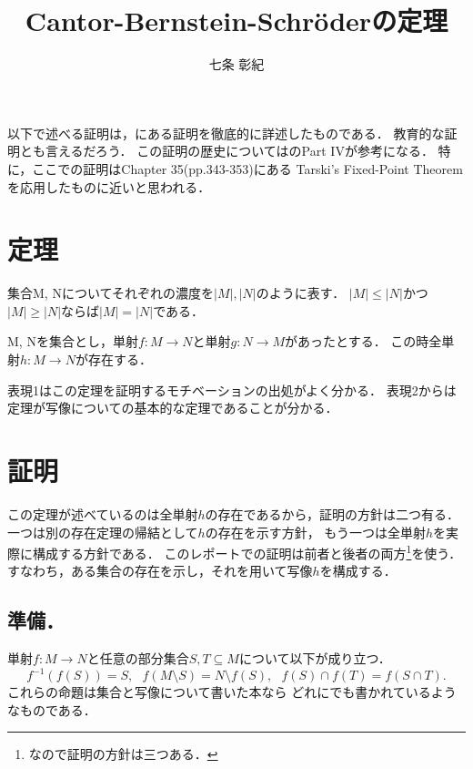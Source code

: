 \documentclass[lualatex, ja=standard, a4paper]{bxjsarticle}
\begin{document}
    \title{Cantor-Bernstein-Schr\"{o}derの定理}
    \author{七条 彰紀}
    \maketitle
    
    以下で述べる証明は，\cite{thebook}にある証明を徹底的に詳述したものである．
    教育的な証明とも言えるだろう．
    この証明の歴史については\cite{cbt}のPart IVが参考になる．
    特に，ここでの証明はChapter 35(pp.343-353)にある
    Tarski's Fixed-Point Theoremを応用したものに近いと思われる．

    \section{定理}
    \begin{Thm}[表現1]
        集合M, Nについてそれぞれの濃度を$|M|, |N|$のように表す．
        $|M| \leq |N|$かつ$|M| \geq |N|$ならば$|M|=|N|$である．
    \end{Thm}

    \begin{Thm}[表現2]
        M, Nを集合とし，単射$f:M \to N$と単射$g: N \to M$があったとする．
        この時全単射$h:M \to N$が存在する．
    \end{Thm}

    表現1はこの定理を証明するモチベーションの出処がよく分かる．
    表現2からは定理が写像についての基本的な定理であることが分かる．

    \section{証明}
    この定理が述べているのは全単射$h$の存在であるから，証明の方針は二つ有る．
    一つは別の存在定理の帰結として$h$の存在を示す方針，
    もう一つは全単射$h$を実際に構成する方針である．
    このレポートでの証明は前者と後者の両方\footnote{なので証明の方針は三つある．}を使う．
    すなわち，ある集合の存在を示し，それを用いて写像$h$を構成する．

    \subsection{準備．}
    単射$f: M \to N$と任意の部分集合$S,T \subseteq M$について以下が成り立つ．
    \[
        f^{-1}(f(S))=S,~~~
        f(M \setminus S)=N \setminus f(S),~~~
        f(S) \cap f(T)=f(S \cap T).
    \]
    これらの命題は集合と写像について書いた本なら
    どれにでも書かれているようなものである．
\end{document}
